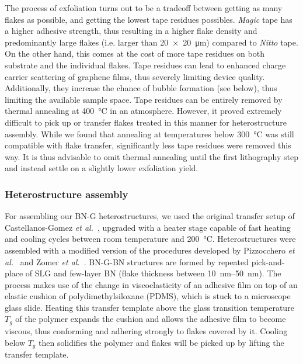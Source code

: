 The process of exfoliation turns out to be a tradeoff between getting as many flakes as possible, and getting the lowest tape residues possibles.
% 
\textit{Magic} tape has a higher adhesive strength, thus resulting in a higher flake density and predominantly large flakes (i.e. larger than \SI{20x20}{\micro\meter}) compared to \textit{Nitto} tape.
% 
On the other hand, this comes at the cost of more tape residues on both substrate and the individual flakes.
% 
Tape residues can lead to enhanced charge carrier scattering of graphene films, thus severely limiting device quality.
% 
Additionally, they increase the chance of bubble formation (see below), thus limiting the available sample space.
% 
Tape residues can be entirely removed by thermal annealing at \SI{400}{\celsius} in  an  atmosphere.
% 
However, it proved extremely difficult to pick up or transfer flakes treated in this manner for heterostructure assembly.
% 
While we found that annealing at temperatures below \SI{300}{\celsius} was still compatible with flake transfer, significantly less tape residues were removed this way.
% 
It is thus advisable to omit thermal annealing until the first lithography step and instead settle on a slightly lower exfoliation yield.

\subsubsection{Heterostructure assembly}

For assembling our BN-G heterostructures, we used the original transfer setup of Castellanos-Gomez \textit{et al.}~\cite{castellanos-gomezDeterministicTransferTwodimensional2014d}, upgraded with a heater stage capable of fast heating and cooling cycles between room temperature and \SI{200}{\celsius}.
%
Heterostructures were assembled with a modified version of the procedures developed by Pizzocchero \textit{et al.}~\cite{pizzoccheroHotPickupTechnique2016a} and Zomer \textit{et al.}~\cite{zomerFastPickTechnique2014b}.
% 
BN-G-BN structures are formed by repeated pick-and-place of SLG and few-layer BN (flake thickness between \SIrange{10}{50}{\nano\meter}).
%
The process makes use of the change in viscoelasticity of an adhesive film on top of an elastic cushion of polydimethylsiloxane (PDMS), which is stuck to a microscope glass slide.
%
Heating this transfer template above the glass transition temperature $T_g$ of the polymer expands the cushion and allows the adhesive film to become viscous, thus conforming and adhering strongly to flakes covered by it.
%
Cooling below $T_g$ then solidifies the polymer and flakes will be picked up by lifting the transfer template.

